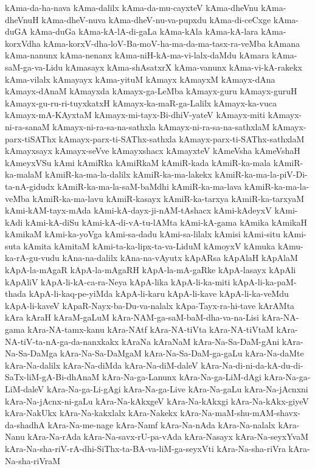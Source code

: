 {kAma-da-ha-nava
kAma-dalilx
kAma-da-mu-cayxteV
kAma-dheVnu
kAma-dheVnuH
kAma-dheV-nuva
kAma-dheV-nu-va-pupxdu
kAma-di-ceCxge
kAma-duGA
kAma-duGa
kAma-kA-lA-di-gaLa
kAma-kAla
kAma-kA-lara
kAma-korxVdha
kAma-korxV-dha-loV-Ba-moV-ha-ma-da-ma-tasx-ra-veMba
kAmana
kAma-nanunx
kAma-nenanx
kAma-niH-kA-ma-vi-lalx-daMdu
kAmara
kAma-saM-ga-va-Lidu
kAmasayx
kAma-shAsatxrX
kAma-vanunx
kAma-vi-kA-rakekx
kAma-vilalx
kAmayayx
kAma-yituM
kAmayx
kAmayxM
kAmayx-dAna
kAmayx-dAnaM
kAmayxda
kAmayx-ga-LeMba
kAmayx-guru
kAmayx-guruH
kAmayx-gu-ru-ri-tuyxkatxH
kAmayx-ka-maR-ga-Lalilx
kAmayx-ka-vuca
kAmayx-mA-KAyxtaM
kAmayx-mi-tayx-Bi-dhiV-yateV
kAmayx-miti
kAmayx-ni-ra-sanaM
kAmayx-ni-ra-sa-na-sathxla
kAmayx-ni-ra-sa-na-sathxlaM
kAmayx-parx-tiSAThx
kAmayx-parx-ti-SAThx-sathxla
kAmayx-parx-ti-SAThx-sathxlaM
kAmayxsayx
kAmayx-seVve
kAmayxshacx
kAmayxteV
kAmeVsha
kAmeVshaH
kAmeyxVSu
kAmi
kAmiRka
kAmiRkaM
kAmiR-kada
kAmiR-ka-mala
kAmiR-ka-malaM
kAmiR-ka-ma-la-dalilx
kAmiR-ka-ma-lakekx
kAmiR-ka-ma-la-piV-Di-ta-nA-gidudx
kAmiR-ka-ma-la-saM-baMdhi
kAmiR-ka-ma-lava
kAmiR-ka-ma-la-veMba
kAmiR-ka-ma-lavu
kAmiR-kasayx
kAmiR-ka-tarxya
kAmiR-ka-tarxyaM
kAmi-kAM-tayx-mAda
kAmi-kA-dayx-ji-nAM-tAshacx
kAmi-kAdeyxV
kAmi-kAdi
kAmi-kA-diSu
kAmi-kA-di-vA-tu-lAMta
kAmi-kA-gama
kAmika
kAmikaH
kAmikaM
kAmi-ka-yoVga
kAmi-sa-dadu
kAmi-sa-lilalx
kAmisi
kAmi-situ
kAmi-suta
kAmita
kAmitaM
kAmi-ta-ka-lipx-ta-va-LiduM
kAmoyxV
kAmuka
kAmu-ka-rA-gu-vudu
kAna-na-dalilx
kAna-na-vAyutx
kApARsa
kApAlaH
kApAlaM
kApA-la-mAgaR
kApA-la-mAgaRH
kApA-la-mA-gaRke
kApA-lasayx
kApAli
kApAliV
kApA-li-kA-ca-ra-Neya
kApA-lika
kApA-li-ka-miti
kApA-li-ka-paM-thada
kApA-li-kaq-pe-yiMda
kApA-li-karu
kApA-li-kave
kApA-li-ka-veMdu
kApA-li-kaveV
kApaR-Nayx-ba-Du-va-nalalx
kApa-Tayx-ra-hi-tave
kArAMta
kAra
kAraH
kAraM-gaLuM
kAra-NAM-ga-saM-baM-dha-va-na-Lisi
kAra-NA-gama
kAra-NA-tamx-kanu
kAra-NAtf
kAra-NA-tiVta
kAra-NA-tiVtaM
kAra-NA-tiV-ta-nA-ga-da-nanxkakx
kAraNa
kAraNaM
kAra-Na-Sa-DaM-gAni
kAra-Na-Sa-DaMga
kAra-Na-Sa-DaMgaM
kAra-Na-Sa-DaM-ga-gaLu
kAra-Na-daMte
kAra-Na-dalilx
kAra-Na-diMda
kAra-Na-diM-daleV
kAra-Na-di-ni-da-kA-du-di-SaTx-liM-gA-Bi-dhAnaM
kAra-Na-ga-Lanunx
kAra-Na-ga-LiM-dAgi
kAra-Na-ga-LiM-daleV
kAra-Na-ga-Li-gAgi
kAra-Na-ga-Live
kAra-Na-gaLu
kAra-Na-jAcnxni
kAra-Na-jAcnx-ni-gaLu
kAra-Na-kAkxgeV
kAra-Na-kAkxgi
kAra-Na-kAkx-giyeV
kAra-NakUkx
kAra-Na-kakxlalx
kAra-Nakekx
kAra-Na-maM-shu-mAM-shavx-da-shadhA
kAra-Na-me-nage
kAra-Namf
kAra-Na-nAda
kAra-Na-nalalx
kAra-Nanu
kAra-Na-rAda
kAra-Na-savx-rU-pa-vAda
kAra-Nasayx
kAra-Na-seyxYvaM
kAra-Na-sha-riV-rA-dhi-SiThx-ta-BA-va-liM-ga-seyxVti
kAra-Na-sha-riVra
kAra-Na-sha-riVraM
}
